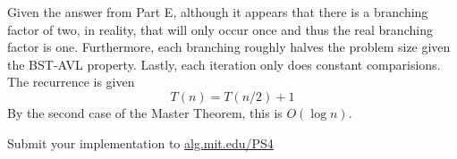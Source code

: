 \documentclass[12pt,twoside]{article}
\begin{document}
\begin{problems}
\begin{problemparts}
\problempart Given the answer from Part E, although it appears that there is
    a branching factor of two, in reality, that will only occur once and thus
    the real branching factor is one. Furthermore, each branching roughly
    halves the problem size given the BST-AVL property. Lastly, each
    iteration only does constant comparisions. The recurrence is given
    $$ T(n) = T(n/2) + 1 $$
    By the second case of the Master Theorem, this is $ O(\log n) $.

\problempart Submit your implementation to {\small\url{alg.mit.edu/PS4}}
\end{problemparts}

\end{problems}
\end{document}
